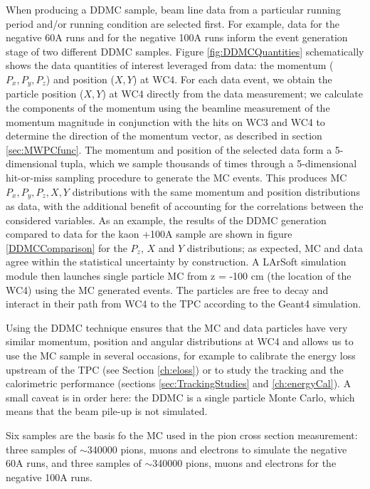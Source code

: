 When producing a DDMC sample, beam line data from a particular running period and/or running condition are selected first. For example, data for the negative 60A runs and for the negative 100A runs inform the event generation stage of two different DDMC samples. Figure \ref{fig:DDMCQuantities}  schematically shows the data quantities of interest leveraged from data: the momentum ($P_x, P_y, P_z$) and position ($X, Y$) at WC4. For each data event, we obtain the  particle position ($X, Y$) at WC4 directly from the data measurement; we calculate the components of the momentum using the beamline measurement of the momentum magnitude in conjunction with the hits on WC3 and WC4 to determine the direction of the momentum vector, as described in section \ref{sec:MWPCfunc}. The momentum and position of the selected data form a 5-dimensional tupla, which we sample thousands of times through a 5-dimensional hit-or-miss sampling procedure to generate the MC events. This produces MC $P_x, P_y, P_z, X, Y$ distributions  with the same momentum and position distributions as data, with the additional benefit of accounting for the correlations between the considered variables.  As an example, the results of the DDMC generation compared to data for the kaon +100A sample are shown in figure \ref{DDMCComparison} for the $P_z$, $X$ and $Y$ distributions; as expected, MC and data agree within the statistical uncertainty by construction. A LArSoft simulation module then launches single particle MC from z = -100 cm (the location of the WC4) using the MC generated events. The particles are free to decay and interact in their path from WC4 to the TPC according to the Geant4 simulation.

Using the DDMC technique ensures that the MC and data particles have very similar momentum, position and angular distributions at WC4 and allows us to use the MC sample in several occasions, for example to calibrate the energy loss upstream of the TPC (see Section \ref{ch:eloss}) or to study the tracking and the calorimetric performance (sections \ref{sec:TrackingStudies} and \ref{ch:energyCal}). A small caveat is in order here: the DDMC is a single particle Monte Carlo, which means that the beam pile-up is not simulated. 


Six samples are the basis fo the MC used in the pion cross section measurement: three samples of  $\sim$340000 pions, muons and electrons to simulate the negative 60A runs, and three samples of $\sim$340000 pions, muons and electrons for the negative 100A runs.

